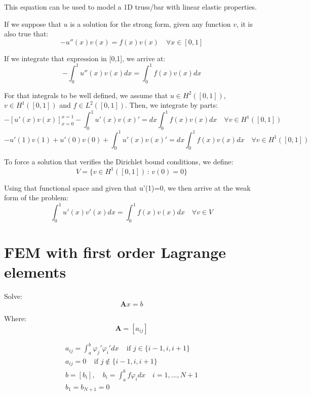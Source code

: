 \documentclass{article}
\begin{document}
\noindent This equation can be used to model a 1D truss/bar with linear elastic properties.


\noindent If we suppose that $u$ is a solution for the strong form, given any function $v$, it is also true that:
\begin{equation*}
    -u''(x)v(x) = f(x)v(x) \quad \forall x\in [0,1]
\end{equation*}

\noindent If we integrate that expression in [0,1], we arrive at:
\begin{equation*}
    -\int_0^1 u''(x)v(x)dx = \int_0^1 f(x)v(x) dx
\end{equation*}

\noindent For that integrals to be well defined, we assume that $u\in H^2([0,1])$, $v\in H^1([0,1])$ and $f\in L^2([0,1])$. Then, we integrate by parts:
\begin{equation*}
    -[u'(x)v(x)]_{x=0}^{x=1}-\int_0^1 u'(x)v(x)'=dx \int_0^1 f(x)v(x) dx \quad\forall v\in H^1([0,1])
\end{equation*}
\begin{equation*}
    -u'(1)v(1)+u'(0)v(0)+\int_0^1 u'(x)v(x)'=dx \int_0^1 f(x)v(x) dx \quad\forall v\in H^1([0,1])
\end{equation*}

\noindent To force a solution that verifies the Dirichlet bound conditions, we define:
\begin{equation*}
    V=\{ v\in H^1([0,1]) \, : \, v(0)=0\}
\end{equation*}

\noindent Using that functional space and given that u'(1)=0, we then arrive at the weak form of the problem:
\begin{equation}
    \int_0^1 u'(x)v'(x)dx= \int_0^1 f(x)v(x) dx \quad\forall v\in V
\end{equation}

\section{FEM with first order Lagrange elements}
\noindent Solve:
\begin{equation*}
    \textbf{A}x=b
\end{equation*}

\noindent Where:
\begin{equation*}
    \textbf{A}=[a_{ij}]
\end{equation*}

\begin{equation}
\begin{gathered}
     a_{ij}=\int_a^b \varphi_j' \varphi_i' dx \;\;\;\;\text{if } j\in\{ i-1,i,i+1\}  \\
     a_{ij}=0 \;\;\;\;\text{if } j\notin\{ i-1,i,i+1\} \\
     b=[b_i], \quad b_{i}=\int_a^b f \varphi_i dx \quad
     i=1,...,N+1 \\
     b_1 = b_{N+1} = 0 
\end{gathered}
\end{equation}
\end{document}
